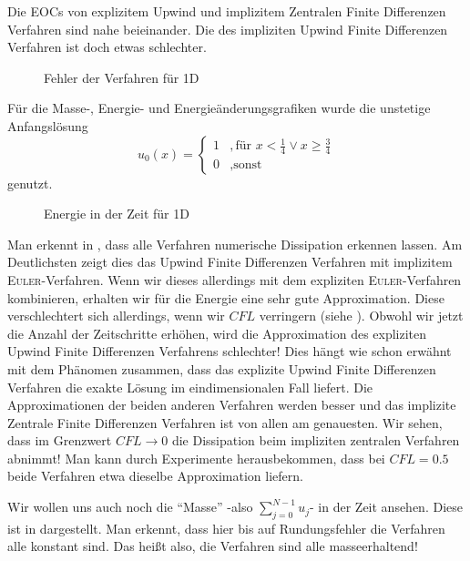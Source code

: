 \documentclass[12pt,a4paper]{scrartcl}
\numberwithin{equation}{section} %
\theoremstyle{definition}
\theoremstyle{plain}
\begin{document}
\par Die EOCs von explizitem Upwind und implizitem Zentralen Finite Differenzen Verfahren sind nahe beieinander. Die des impliziten Upwind Finite Differenzen Verfahren ist doch etwas schlechter. 
\begin{figure}[h]
\caption{Fehler der Verfahren für 1D}
\end{figure}
\par Für die Masse-, Energie- und Energieänderungsgrafiken wurde die unstetige Anfangslösung
\begin{equation}
u_0(x)=\begin{cases}
1&,\text{für }x<\frac{1}{4}\lor x\ge\frac{3}{4}\\
0&,\text{sonst}\end{cases}
\end{equation} genutzt.
\begin{figure}
\caption{Energie in der Zeit für 1D}
\label{fig:Enplot}
\end{figure}
Man erkennt in , dass alle Verfahren numerische Dissipation erkennen lassen. Am Deutlichsten zeigt dies das Upwind Finite Differenzen Verfahren mit implizitem \textsc{Euler}-Verfahren. Wenn wir dieses allerdings mit dem expliziten \textsc{Euler}-Verfahren kombinieren, erhalten wir für die Energie eine sehr gute Approximation. Diese verschlechtert sich allerdings, wenn wir $CFL$ verringern (siehe ). Obwohl wir jetzt die Anzahl der Zeitschritte erhöhen, wird die Approximation des expliziten Upwind Finite Differenzen Verfahrens schlechter! Dies hängt wie schon erwähnt mit dem Phänomen zusammen, dass das explizite Upwind Finite Differenzen Verfahren die exakte Lösung im eindimensionalen Fall liefert. Die Approximationen der beiden anderen Verfahren werden besser und das implizite Zentrale Finite Differenzen Verfahren ist von allen am genauesten. Wir sehen, dass im Grenzwert $CFL\to 0$ die Dissipation beim impliziten zentralen Verfahren abnimmt!
Man kann durch Experimente herausbekommen, dass bei $CFL=0.5$ beide Verfahren etwa dieselbe Approximation liefern.
\par Wir wollen uns auch noch die "`Masse"' -also $\sum_{j=0}^{N-1}u_j$- in der Zeit ansehen. Diese ist in  dargestellt. Man erkennt, dass hier bis auf Rundungsfehler die Verfahren alle konstant sind. Das heißt also, die Verfahren sind alle masseerhaltend!
\end{document}

